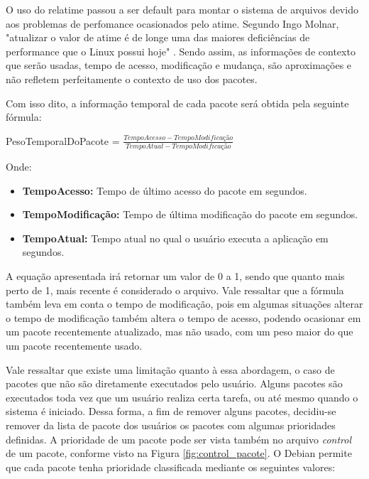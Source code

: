 O uso do relatime passou a ser default para montar o sistema de arquivos devido
aos problemas de perfomance ocasionados pelo atime. Segundo Ingo Molnar, "atualizar o valor
de atime é de longe uma das maiores deficiências de performance que o Linux possui
hoje" \cite{3_corbet_2007}. Sendo assim, as informações de contexto que serão
usadas, tempo de acesso, modificação e mudança, são aproximações e não
refletem perfeitamente o contexto de uso dos pacotes.

Com isso dito, a informação temporal de cada pacote será obtida pela seguinte
fórmula:

PesoTemporalDoPacote = $\frac{TempoAcesso - TempoModificação}{TempoAtual -
TempoModificação}$


Onde:

\begin{itemize}
    \item \textbf{TempoAcesso:} Tempo de último acesso do pacote em segundos.
    \item \textbf{TempoModificação:} Tempo de última modificação do pacote em
        segundos.
    \item \textbf{TempoAtual:} Tempo atual no qual o usuário executa a
        aplicação em segundos.
\end{itemize}


A equação apresentada irá retornar um valor de 0 a 1, sendo que quanto mais
perto de 1, mais recente é considerado o arquivo. Vale ressaltar que a fórmula
também leva em conta o tempo de modificação, pois em algumas situações alterar o
tempo de modificação também altera o tempo de acesso, podendo ocasionar em um
pacote recentemente atualizado, mas não usado, com um peso maior do que um
pacote recentemente usado.

Vale ressaltar que existe uma limitação quanto à essa abordagem, o caso de
pacotes que não são diretamente executados pelo usuário. Alguns pacotes são
executados toda vez que um usuário realiza certa tarefa, ou até mesmo quando o
sistema é iniciado. Dessa forma, a fim de remover alguns pacotes, decidiu-se
remover da lista de pacote dos usuários os pacotes com algumas prioridades definidas.
A prioridade de um pacote pode ser vista também no arquivo \textit{control} de um pacote, conforme visto
na Figura \ref{fig:control_pacote}. O Debian permite que cada pacote tenha
prioridade classificada mediante os seguintes valores:

